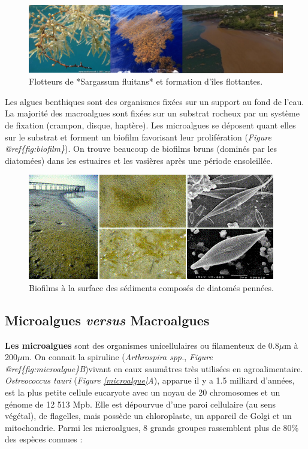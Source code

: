 \documentclass[
]{book}
\begin{document}
\begin{figure}

{\centering \includegraphics{images/sargasse} 

}

\caption{Flotteurs de *Sargassum fluitans* et formation d'îles flottantes.}\label{fig:sargasse}
\end{figure}

Les algues benthiques sont des organismes fixées sur un support au fond de l'eau. La majorité des macroalgues sont fixées sur un substrat rocheux par un système de fixation (crampon, disque, haptère). Les microalgues se déposent quant elles sur le substrat et forment un biofilm favorisant leur prolifération (\emph{Figure @ref\{fig:biofilm\}}). On trouve beaucoup de biofilms bruns (dominés par les diatomées) dans les estuaires et les vasières après une période ensoleillée.

\begin{figure}

{\centering \includegraphics{images/biofilm} 

}

\caption{Biofilms à la surface des sédiments composés de diatomés pennées.}\label{fig:biofilm}
\end{figure}

\hypertarget{microalgues-versus-macroalgues}{%
\subsection{\texorpdfstring{Microalgues \emph{versus} Macroalgues}{Microalgues versus Macroalgues}}\label{microalgues-versus-macroalgues}}

\textbf{Les microalgues} sont des organismes unicellulaires ou filamenteux de 0.8\(\mu\)m à 200\(\mu\)m. On connait la spiruline (\emph{Arthrospira spp.}, \emph{Figure @ref\{fig:microalgue\}B})vivant en eaux saumâtres très utilisées en agroalimentaire. \emph{Ostreococcus tauri} (\emph{Figure \ref{microalgue}A}), apparue il y a 1.5 milliard d'années, est la plus petite cellule eucaryote avec un noyau de 20 chromosomes et un génome de 12 513 Mpb. Elle est dépourvue d'une paroi cellulaire (au sens végétal), de flagelles, mais possède un chloroplaste, un appareil de Golgi et un mitochondrie. Parmi les microalgues, 8 grands groupes rassemblent plus de 80\% des espèces connues :
\end{document}
